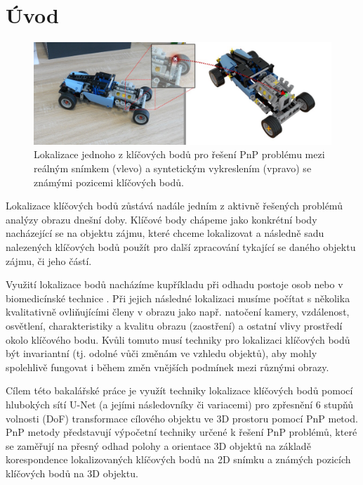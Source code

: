 \chapter{Úvod}
\label{sec:Introduction}

\begin{figure}[H]
\centering
\includegraphics[width=1.0\textwidth,keepaspectratio]{Figures/bp_uvodni_obrazek.jpg}
\caption[Lokalizace klíčového bodu pro řešení PnP problému]{Lokalizace jednoho z klíčových bodů pro řešení PnP problému mezi reálným snímkem (vlevo) a syntetickým vykreslením (vpravo) se známými pozicemi klíčových bodů.}
\label{fig:bp_uvodni_obrazek}
\end{figure}


Lokalizace klíčových bodů zůstává nadále jedním z aktivně řešených problémů analýzy obrazu dnešní doby.
Klíčové body chápeme jako konkrétní body nacházející se na objektu zájmu, které chceme lokalizovat a následně sadu nalezených klíčových bodů použít pro další zpracování tykající se daného objektu zájmu, či jeho částí.

Využití lokalizace bodů nacházíme kupříkladu při odhadu postoje osob \cite{humanpose} nebo v biomedicínské technice \cite{unet}.
Při jejich následné lokalizaci musíme počítat s několika kvalitativně ovliňujícími členy v obrazu jako např. natočení kamery, vzdálenost, osvětlení, charakteristiky a kvalitu obrazu (zaostření) a ostatní vlivy prostředí okolo klíčového bodu. Kvůli tomuto musí techniky pro lokalizaci klíčových bodů být invariantní (tj. odolné vůči změnám ve vzhledu objektů), aby mohly spolehlivě fungovat i během změn vnějších podmínek mezi různými obrazy.

Cílem této bakalářské práce je využít techniky lokalizace klíčových bodů pomocí hlubokých sítí U-Net (a jejími následovníky či variacemi) pro zpřesnění 6 stupňů volnosti (DoF) transformace cílového objektu ve 3D prostoru pomocí PnP metod. PnP metody představují výpočetní techniky určené k řešení PnP problémů, které se zaměřují na přesný odhad polohy a orientace 3D objektů na základě korespondence lokalizovaných klíčových bodů na 2D snímku a známých pozicích klíčových bodů na 3D objektu.

